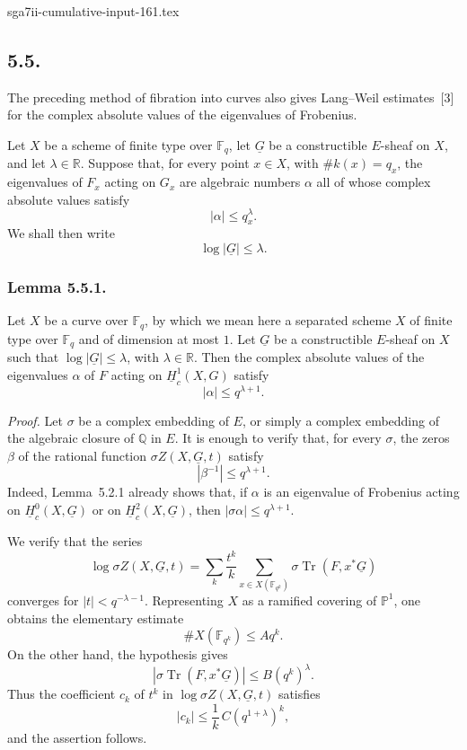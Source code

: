 \begin{filecontents*}{sga7ii-cumulative-input-161.tex}
\subsection*{5.5.}
The preceding method of fibration into curves also gives Lang--Weil
estimates~[3] for the complex absolute values of the eigenvalues of
Frobenius.

Let $X$ be a scheme of finite type over $\mathbb F_q$, let $\underline G$
be a constructible $E$-sheaf on $X$, and let $\lambda\in\mathbb R$.  Suppose
that, for every point $x\in X$, with $\#k(x)=q_x$, the eigenvalues of $F_x$
acting on $G_x$ are algebraic numbers $\alpha$ all of whose complex absolute
values satisfy
\[
|\alpha|\leq q_x^\lambda.
\]
We shall then write
\[
\log|\underline G|\leq\lambda.
\]

\subsubsection*{Lemma 5.5.1.}
Let $X$ be a curve over $\mathbb F_q$, by which we mean here a separated
scheme $X$ of finite type over $\mathbb F_q$ and of dimension at most $1$.
Let $\underline G$ be a constructible $E$-sheaf on $X$ such that
$\log|\underline G|\leq\lambda$, with $\lambda\in\mathbb R$.  Then the
complex absolute values of the eigenvalues $\alpha$ of $F$ acting on
$\underline H_c^1(X,G)$ satisfy
\[
|\alpha|\leq q^{\lambda+1}.
\]

\medskip
\noindent\emph{Proof.}
Let $\sigma$ be a complex embedding of $E$, or simply a complex embedding of
the algebraic closure of $\mathbb Q$ in $E$.  It is enough to verify that,
for every $\sigma$, the zeros $\beta$ of the rational function
$\sigma Z(X,\underline G,t)$ satisfy
\[
|\beta^{-1}|\leq q^{\lambda+1}.
\]
Indeed, Lemma~5.2.1 already shows that, if $\alpha$ is an eigenvalue of
Frobenius acting on $\underline H_c^0(X,\underline G)$ or on
$\underline H_c^2(X,\underline G)$, then
$|\sigma\alpha|\leq q^{\lambda+1}$.

We verify that the series
\[
\log\sigma Z(X,\underline G,t)
=\sum_k\frac{t^k}{k}
  \sum_{x\in X(\mathbb F_{q^k})}
  \sigma\operatorname{Tr}(F,x^*\underline G)
\]
converges for $|t|<q^{-\lambda-1}$.  Representing $X$ as a ramified covering
of $\mathbb P^1$, one obtains the elementary estimate
\[
\#X(\mathbb F_{q^k})\leq A q^k.
\]
On the other hand, the hypothesis gives
\[
\left|\sigma\operatorname{Tr}(F,x^*\underline G)\right|
\leq B(q^k)^\lambda.
\]
Thus the coefficient $c_k$ of $t^k$ in
$\log\sigma Z(X,\underline G,t)$ satisfies
\[
|c_k|\leq\frac{1}{k}\,C(q^{1+\lambda})^k,
\]
and the assertion follows.


\end{filecontents*}
